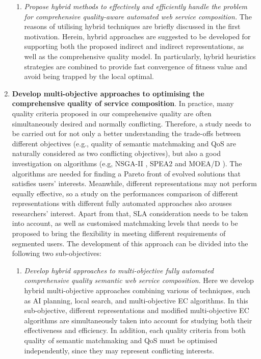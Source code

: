 \begin{enumerate}
\begin{enumerate}
    \item \emph{Propose hybrid methods to effectively and efficiently handle the problem for comprehensive quality-aware automated web service composition.} The reasons of utilising hybrid techniques are briefly discussed in the first motivation. Herein, hybrid approaches are suggested to be developed for supporting both the proposed indirect and indirect representations, as well as the comprehensive quality model. In particularly, hybrid heuristics strategies are combined to provide fast convergence of fitness value and avoid being trapped by the local optimal.
  \end{enumerate}
 
 \item \textbf{Develop multi-objective approaches to optimising the comprehensive quality of service composition}. In practice, many quality criteria proposed in our comprehensive quality are often simultaneously desired and normally conflicting. Therefore, a study needs to be carried out for not only a better understanding the trade-offs between different objectives (e.g., quality of semantic matchmaking and QoS are naturally considered as two conflicting objectives), but also a good investigation on algorithms (e.g, NSGA-II \cite{deb2002fast}, SPEA2 \cite{zitzler2001spea2} and MOEA/D \cite{zhang2007moea}). The algorithms are needed for finding a Pareto front of evolved solutions that satisfies users' interests. Meanwhile, different representations may not perform equally effective, so a study on the performances comparison of different representations with different fully automated approaches also arouses researchers' interest. Apart from that, SLA consideration needs to be taken into account, as well as customised matchmaking levels that needs to be proposed to bring the flexibility in meeting different requirements of segmented users. The development of this approach can be divided into the following two sub-objectives:
   \begin{enumerate}
    \item \emph{Develop hybrid approaches to multi-objective fully automated comprehensive quality semantic web service composition}. Here we develop hybrid multi-objective approaches combining various of techniques, such as AI planning, local search, and multi-objective EC algorithms. In this sub-objective, different representations and modified multi-objective EC algorithms are simultaneously taken into account for studying both their effectiveness and efficiency. In addition, each quality criteria from both quality of semantic matchmaking and QoS must be optimised independently, since they may represent conflicting interests.


\end{enumerate}
\end{enumerate}
